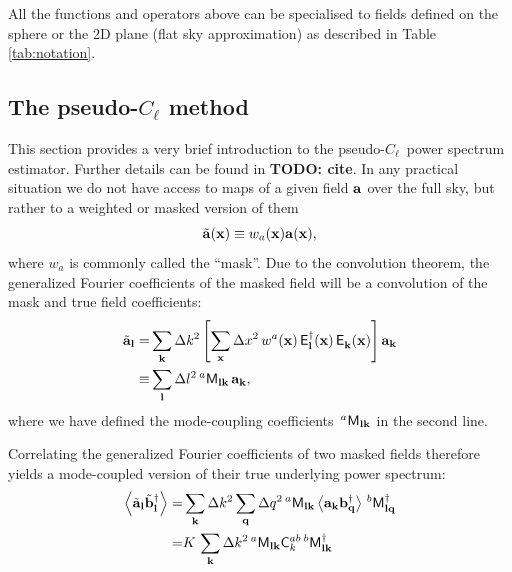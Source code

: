 \documentclass[a4paper,11pt]{article}
\newcommand{\todo}[1]{{\bf TODO: #1}}
\newcommand{\PCL}{pseudo-$C_\ell$~}
\newcommand{\summ}[1]{\sum_{\bf #1}\Delta #1^2}
\newcommand{\Ylm}[3]{{\sf E}^{#1}_{\bf #2}({\bf #3})}
\begin{document}
    All the functions and operators above can be specialised to fields defined on the sphere or the 2D plane (flat sky approximation) as described in Table \ref{tab:notation}.

  
  \subsection{The pseudo-$C_\ell$ method}\label{ssec:theory.pcl}
  \label{S:pcl}
    This section provides a very brief introduction to the \PCL power spectrum estimator. Further details can be found in \todo{cite}. 
    In any practical situation we do not have access to maps of a given field ${\bf a}$ over the full sky, but rather to a weighted or masked version of them
    \begin{equation}
      \tilde{\bf a}({\bf x})\equiv w_a({\bf x}){\bf a}({\bf x}),
      \label{eq:mask}
    \end{equation}
    where $w_a$ is commonly called the ``mask''. Due to the convolution theorem, the generalized Fourier coefficients of the masked field will be a convolution of the mask and true field coefficients:
    \begin{align}\nonumber
      \tilde{\bf a}_{\bf l}=&\summ{k}\left[\summ{x}\,w^a({\bf x})\,\Ylm{\dag}{l}{x}\,\Ylm{}{k}{x}\right]{\bf a}_{\bf k}\\
                      \equiv&\summ{l}\,^a{\sf M}_{{\bf l}{\bf k}}\,{\bf a}_{\bf k},
    \end{align}
    where we have defined the mode-coupling coefficients $\,^a{\sf M}_{{\bf l}{\bf k}}$ in the second line.
    
    Correlating the generalized Fourier coefficients of two masked fields therefore yields a mode-coupled version of their true underlying power spectrum:
    \begin{align}\nonumber
      \left\langle\tilde{\bf a}_{\bf l}\tilde{\bf b}^\dag_{\bf l}\right\rangle=&\summ{k}\summ{q}\,^a{\sf M}_{{\bf l}{\bf k}}\left\langle{\bf a}_{\bf k}{\bf b}^\dag_{\bf q}\right\rangle\,^b{\sf M}^\dag_{{\bf l}{\bf q}}\\
                                                                              =&K\,\summ{k}\,^a{\sf M}_{{\bf l}{\bf k}}{\sf C}^{ab}_k\,^b{\sf M}^\dag_{{\bf l}{\bf k}}
        \label{eq:M}                                                                             
    \end{align}
    
\end{document}

